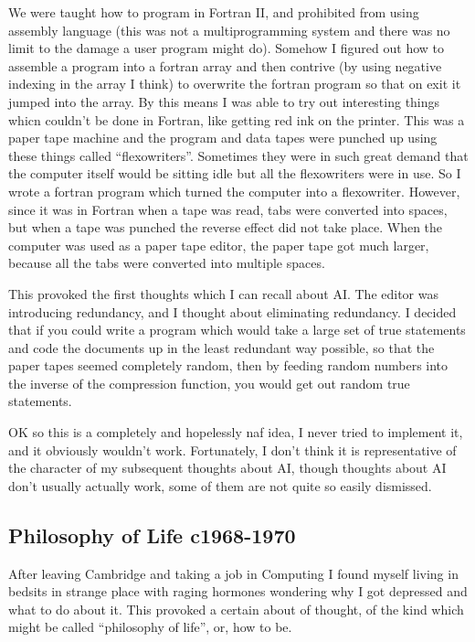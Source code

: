 \documentclass{rbjk}
\begin{document}
\begin{article}
We were taught how to program in Fortran II, and prohibited from using assembly language (this was not a multiprogramming system and there was no limit to the damage a user program might do).
Somehow I figured out how to assemble a program into a fortran array and then contrive (by using negative indexing in the array I think) to overwrite the fortran program so that on exit it jumped into the array.
By this means I was able to try out interesting things whicn couldn't be done in Fortran, like getting red ink on the printer.
This was a paper tape machine and the program and data tapes were punched up using these things called ``flexowriters''.
Sometimes they were in such great demand that the computer itself would be sitting idle but all the flexowriters were in use.
So I wrote a fortran program which turned the computer into a flexowriter.
However, since it was in Fortran when a tape was read, tabs were converted into spaces, but when a tape was punched the reverse effect did not take place.
When the computer was used as a paper tape editor, the paper tape got much larger, because all the tabs were converted into multiple spaces.

This provoked the first thoughts which I can recall about AI.
The editor was introducing redundancy, and I thought about eliminating redundancy.
I decided that if you could write a program which would take a large set of true statements and code the documents up in the least redundant way possible, so that the paper tapes seemed completely random, then by feeding random numbers into the inverse of the compression function, you would get out random true statements.

OK so this is a completely and hopelessly naf idea, I never tried to implement it, and it obviously wouldn't work.
Fortunately, I don't think it is representative of the character of my subsequent thoughts about AI, though thoughts about AI don't usually actually work, some of them are not quite so easily dismissed.

\subsection{Philosophy of Life c1968-1970}

After leaving Cambridge and taking a job in Computing I found myself living in bedsits in strange place with raging hormones wondering why I got depressed and what to do about it.
This provoked a certain about of thought, of the kind which might be called ``philosophy of life'', or, how to be.


\end{article}
\end{document}
